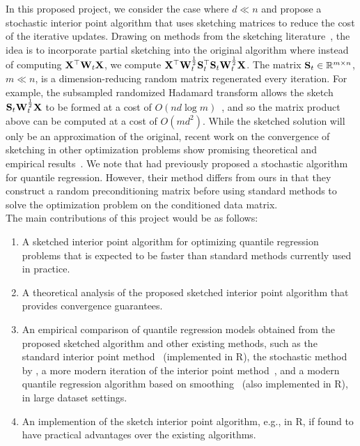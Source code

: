 In this proposed project, we consider the case where $d\ll n$ and propose a stochastic interior point algorithm that uses sketching matrices to reduce the cost of the iterative updates. Drawing on methods from the sketching literature~\cite{Pilanci:2017}, the idea is to incorporate partial sketching into the original algorithm where instead of computing $\mathbf{X}^\top\mathbf{W}_t\mathbf{X}$, we compute $\mathbf{X}^\top\mathbf{W}_t^\frac{1}{2}\mathbf{S}_t^\top\mathbf{S}_t\mathbf{W}_t^\frac{1}{2}\mathbf{X}$.
The matrix $\mathbf{S}_t\in\mathbb{R}^{m\times n}$, $m\ll n$, is a dimension-reducing random matrix regenerated every iteration. For example, the subsampled randomized Hadamard transform allows the sketch $\mathbf{S}_t\mathbf{W}_t^\frac{1}{2}\mathbf{X}$ to be formed at a cost of $O(nd\log m)$~\citep{Lacotte:2020}, and so the matrix product above can be computed at a cost of $O(md^2)$. While the sketched solution will only be an approximation of the original, recent work on the convergence of sketching in other optimization problems show promising theoretical and empirical results~\citep[e.g.,][]{Pilanci:2017,Derezinski:2021,Lacotte:2021}. We note that \citet{Yang:2013} had previously proposed a stochastic algorithm for quantile regression. However, their method differs from ours in that they construct a random preconditioning matrix before using standard methods to solve the optimization problem on the conditioned data matrix.
\\

The main contributions of this project would be as follows:
\begin{enumerate}
\item
A sketched interior point algorithm for optimizing quantile regression problems that is expected to be faster than standard methods currently used in practice.
\item
A theoretical analysis of the proposed sketched interior point algorithm that provides convergence guarantees.
\item
An empirical comparison of quantile regression models obtained from the proposed sketched algorithm and other existing methods, such as the standard interior point method~\citep{Portnoy:1997} (implemented in R), the stochastic method by \citet{Yang:2013}, a more modern iteration of the interior point method~\citep{Zhao:2020}, and a modern quantile regression algorithm based on smoothing~\citep{He:2021} (also implemented in R), in large dataset settings.
\item
An implemention of the sketch interior point algorithm, e.g., in R, if found to have practical advantages over the existing algorithms.
\end{enumerate}

